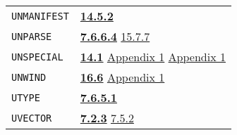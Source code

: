 \documentclass[a4paper,]{article}
\begin{document}
\begin{longtable}[]{@{}ll@{}}
\begin{minipage}[t]{0.24\columnwidth}\raggedright\strut
\texttt{UNMANIFEST}\strut
\end{minipage} & \begin{minipage}[t]{0.70\columnwidth}\raggedright\strut
\textbf{\href{14-data-type-declarations.md\#1452-manifest-and-unmanifest}{14.5.2}}\strut
\end{minipage}\tabularnewline
\begin{minipage}[t]{0.24\columnwidth}\raggedright\strut
\texttt{UNPARSE}\strut
\end{minipage} & \begin{minipage}[t]{0.70\columnwidth}\raggedright\strut
\textbf{\href{07-structured-objects.md\#7664-unparse-1}{7.6.6.4}} \href{15-lexical-blocking.md\#1577-pname}{15.7.7}\strut
\end{minipage}\tabularnewline
\begin{minipage}[t]{0.24\columnwidth}\raggedright\strut
\texttt{UNSPECIAL}\strut
\end{minipage} & \begin{minipage}[t]{0.70\columnwidth}\raggedright\strut
\textbf{\href{14-data-type-declarations.md\#141-patterns}{14.1}}
\href{appendix-1-a-look-inside.md\#the-control-stack}{Appendix 1}
\href{appendix-1-a-look-inside.md\#variable-bindings}{Appendix 1}\strut
\end{minipage}\tabularnewline
\begin{minipage}[t]{0.24\columnwidth}\raggedright\strut
\texttt{UNWIND}\strut
\end{minipage} & \begin{minipage}[t]{0.70\columnwidth}\raggedright\strut
\textbf{\href{16-errors-frames-etc.md\#166-unwind}{16.6}} \href{appendix-1-a-look-inside.md\#variable-bindings}{Appendix
1}\strut
\end{minipage}\tabularnewline
\begin{minipage}[t]{0.24\columnwidth}\raggedright\strut
\texttt{UTYPE}\strut
\end{minipage} & \begin{minipage}[t]{0.70\columnwidth}\raggedright\strut
\textbf{\href{07-structured-objects.md\#7651-utype-1}{7.6.5.1}}\strut
\end{minipage}\tabularnewline
\begin{minipage}[t]{0.24\columnwidth}\raggedright\strut
\texttt{UVECTOR}\strut
\end{minipage} & \begin{minipage}[t]{0.70\columnwidth}\raggedright\strut
\textbf{\href{07-structured-objects.md\#723-uvector-1}{7.2.3}} \href{07-structured-objects.md\#752-quote-1}{7.5.2}

\end{minipage}
\end{longtable}
\end{document}
